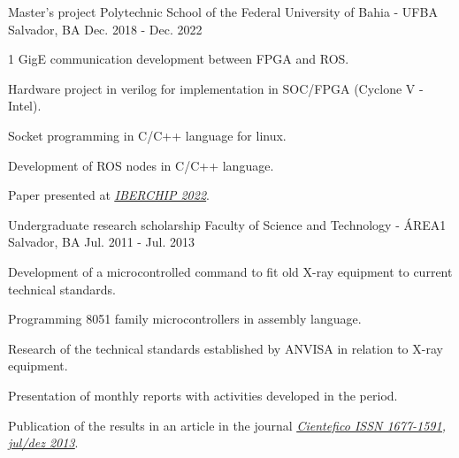 \begin{cventries}
  \cventry
    {Master's project} %
    {Polytechnic School of the Federal University of Bahia - UFBA} %
    {Salvador, BA} %
    {Dec. 2018 - Dec. 2022} %
    {
      \begin{cvitems} %
        \item {1 GigE communication development between FPGA and ROS.}
        \item {Hardware project in verilog for implementation in SOC/FPGA (Cyclone V - Intel).}
        \item {Socket programming in C/C++ language for linux.}
        \item {Development of ROS nodes in C/C++ language.}
        \item {Paper presented at \underline{\href{https://ieee-lascas.org/}{\emph{IBERCHIP 2022}}}.}
      \end{cvitems}
    }

  \cventry
    {Undergraduate research scholarship} %
    {Faculty of Science and Technology - ÁREA1} %
    {Salvador, BA} %
    {Jul. 2011 - Jul. 2013} %
    {
      \begin{cvitems} %
        \item {Development of a microcontrolled command to fit old X-ray equipment to current technical standards.}
        \item {Programming 8051 family microcontrollers in assembly language.}
        \item {Research of the technical standards established by ANVISA in relation to X-ray equipment.}
        \item {Presentation of monthly reports with activities developed in the period.}
        \item {Publication of the results in an article in the journal \underline{\href{https://cientefico.emnuvens.com.br/cientefico/article/view/58}{\emph{Cientefico ISSN 1677-1591, jul/dez 2013}}}.}
      \end{cvitems}
    }
    

\end{cventries}

